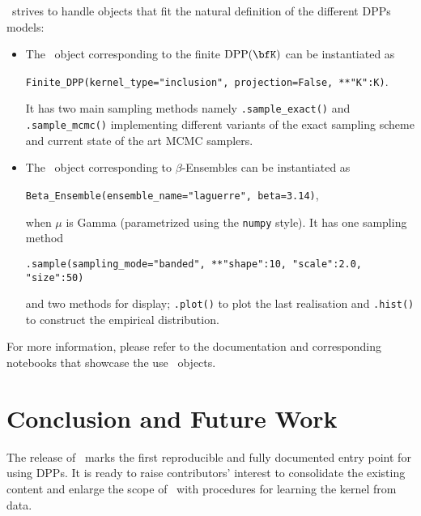 \documentclass[twoside,11pt]{article}
\begin{document}
  \DPPy\ strives to handle objects that fit the natural definition of the different DPPs models:
  \begin{itemize}
	  \item The \DPPy\ object corresponding to the finite $\DPP(\bfK)$ can be instantiated as
	  \begin{nscenter}
	  	\texttt{Finite_DPP(kernel_type="inclusion", projection=False, **{"K":K})}.
	  \end{nscenter}
		It has two main sampling methods namely \texttt{.sample_exact()} and \texttt{.sample_mcmc()} implementing different variants of the exact sampling scheme and current state of the art MCMC samplers.

		\item The \DPPy\ object corresponding to $\beta$-Ensembles can be instantiated as
		\begin{nscenter}
			\texttt{Beta_Ensemble(ensemble_name="laguerre", beta=3.14)},
		\end{nscenter}
		when $\mu$ is Gamma (parametrized using the \texttt{numpy} style).
		It has one sampling method
		\begin{nscenter}
			\texttt{.sample(sampling_mode="banded", **{"shape":10, "scale":2.0, "size":50})}
		\end{nscenter}
		and two methods for display; \texttt{.plot()} to plot the last realisation and \texttt{.hist()} to construct the empirical distribution.

  \end{itemize}

  For more information, please refer to the documentation and corresponding notebooks that showcase the use \DPPy\ objects.




\section{Conclusion and Future Work} %
\label{sec:conclusion_and_future_work}

The release of \DPPy\ marks the first reproducible and fully documented entry point for using DPPs. It is ready to raise contributors' interest to consolidate the existing content and enlarge the scope of \DPPy\ \eg with procedures for learning the kernel from data.

\end{document}
